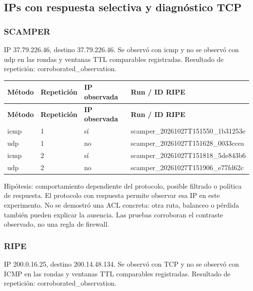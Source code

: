 \subsection{IPs con respuesta selectiva y diagnóstico TCP}\label{sec:selectiva}
\subsubsection{SCAMPER}
IP 37.79.226.46, destino 37.79.226.46. Se observó con icmp y no se observó con udp en las rondas y ventanas TTL comparables registradas. Resultado de repetición: corroborated\_\allowbreak{}observation.

\begingroup
\fontsize{9}{11}\selectfont
\addtocounter{table}{-1}
\begin{longtable}{p{1.5cm}p{1.8cm}p{2.2cm}p{8.7cm}}
\toprule
\textbf{Método} & \textbf{Repetición} & \textbf{IP observada} & \textbf{Run / ID RIPE} \\ \midrule
\endfirsthead
\toprule
\textbf{Método} & \textbf{Repetición} & \textbf{IP observada} & \textbf{Run / ID RIPE} \\ \midrule
\endhead
icmp & 1 & sí & scamper\_\allowbreak{}20261027T151550\_\allowbreak{}1b31253e \\
udp & 1 & no & scamper\_\allowbreak{}20261027T151628\_\allowbreak{}0033ccea \\
icmp & 2 & sí & scamper\_\allowbreak{}20261027T151818\_\allowbreak{}5de843b6 \\
udp & 2 & no & scamper\_\allowbreak{}20261027T151906\_\allowbreak{}e77fd62c \\
\bottomrule
\end{longtable}
\endgroup
Hipótesis: comportamiento dependiente del protocolo, posible filtrado o política de respuesta. El protocolo con respuesta permite observar esa IP en este experimento. No se demostró una ACL concreta: otra ruta, balanceo o pérdida también pueden explicar la ausencia. Las pruebas corroboran el contraste observado, no una regla de firewall.

\subsubsection{RIPE}
IP 200.0.16.25, destino 200.14.48.134. Se observó con TCP y no se observó con ICMP en las rondas y ventanas TTL comparables registradas. Resultado de repetición: corroborated\_\allowbreak{}observation.

